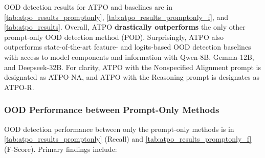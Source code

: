OOD detection results for ATPO and baselines are in \ref{tab:atpo_results_promptonly}, \ref{tab:atpo_results_promptonly_f}, and \ref{tab:atpo_results}. Overall, ATPO \textbf{drastically outperforms} the only other prompt-only OOD detection method (POD). Surprisingly, ATPO also outperforms state-of-the-art feature- and logits-based OOD detection baselines with access to model components and information with Qwen-8B, Gemma-12B, and Deepseek-32B. For clarity, ATPO with the Nonspecified Alignment prompt is designated as ATPO-NA, and ATPO with the Reasoning prompt is designates as ATPO-R.

\subsubsection{OOD Performance between Prompt-Only Methods}

OOD detection performance between only the prompt-only methods is in \ref{tab:atpo_results_promptonly} (Recall) and \ref{tab:atpo_results_promptonly_f} (F-Score). Primary findings include:

